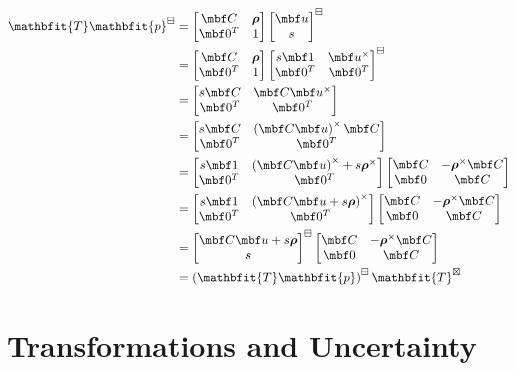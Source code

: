 \documentclass[11pt,letterpaper,fleqn,oneside]{article}
\newcommand{\bbm}{\begin{bmatrix}}
\newcommand{\ebm}{\end{bmatrix}}
\newcommand{\mbs}[1]{{\boldsymbol{#1}}}
\newcommand{\homo}[1]{{\mathbfit{#1}}}
\newcommand{\mbfh}[1]{{\homo{#1}}}
\begin{document}
\begin{subequations}
  \label{}
  \begin{flalign}
     \mbfh T \mbfh p^\boxminus &=  
       \bbm \mbf C  & \mbs \rho \\ 
            \mbf 0^T& 1 
       \ebm 
       \bbm 
         \mbf u\\
         s 
       \ebm^\boxminus\\
     &=  
       \bbm \mbf C  & \mbs \rho \\ 
            \mbf 0^T& 1 
       \ebm 
       \bbm 
         s\mbf 1 & \mbf u^\times\\
         \mbf 0^T & \mbf 0^T
       \ebm^\boxminus\\
    & = 
      \bbm
        s \mbf C & \mbf C \mbf u^\times\\
         \mbf 0^T & \mbf 0^T  
      \ebm\\
    & = 
      \bbm
        s \mbf C & \left(\mbf C \mbf u\right)^\times \mbf C\\
         \mbf 0^T & \mbf 0^T  
      \ebm\\
    & = 
      \bbm
        s \mbf 1 & \left(\mbf C \mbf u \right)^\times + s \mbs \rho^\times\\
         \mbf 0^T & \mbf 0^T  
      \ebm
      \bbm
        \mbf C & -\mbs \rho^\times \mbf C \\
        \mbf 0 & \mbf C
      \ebm\\
    & = 
      \bbm
        s \mbf 1 & \left(\mbf C \mbf u + s \mbs \rho \right)^\times\\
         \mbf 0^T & \mbf 0^T  
      \ebm
      \bbm
        \mbf C & -\mbs \rho^\times \mbf C \\
        \mbf 0 & \mbf C
      \ebm\\
    & = 
      \bbm
        \mbf C \mbf u + s \mbs \rho\\
         s
      \ebm^\boxminus
      \bbm
        \mbf C & -\mbs \rho^\times \mbf C \\
        \mbf 0 & \mbf C
      \ebm\\
   &= \left( \mbfh T \mbfh p \right)^\boxminus \mbfh T^\boxtimes 
  \end{flalign}
\end{subequations}

\section{Transformations and Uncertainty}
\end{document}
